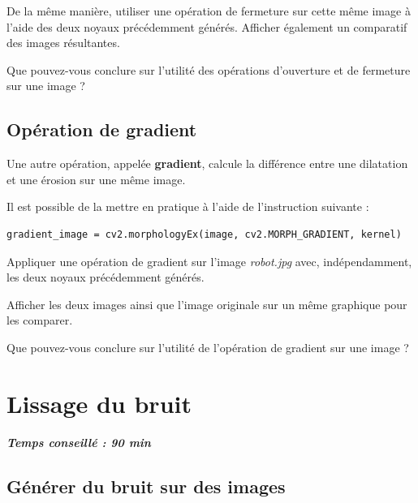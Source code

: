 \documentclass[a4paper,11pt,titlepage]{article} %
\begin{document}
\Manip De la même manière, utiliser une opération de fermeture sur cette même image à l'aide des deux noyaux précédemment générés. Afficher également un comparatif des images résultantes.

\Quest Que pouvez-vous conclure sur l'utilité des opérations d'ouverture et de fermeture sur une image ?



\subsection{Opération de gradient}

Une autre opération, appelée \textbf{gradient}, calcule la différence entre une dilatation et une érosion sur une même image. 

Il est possible de la mettre en pratique à l'aide de l'instruction suivante :

\begin{lstlisting}
gradient_image = cv2.morphologyEx(image, cv2.MORPH_GRADIENT, kernel)
\end{lstlisting}

\Manip Appliquer une opération de gradient sur l'image \textsl{robot.jpg} avec, indépendamment, les deux noyaux précédemment générés. 

\Manip Afficher les deux images ainsi que l'image originale sur un même graphique pour les comparer.

\Quest Que pouvez-vous conclure sur l'utilité de l'opération de gradient sur une image ?



\section{Lissage du bruit}

\begin{center} \textbf{\textit{Temps conseillé : 90 min}} \end{center}

\subsection{Générer du bruit sur des images}
\end{document}
